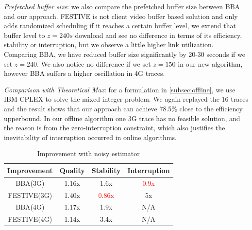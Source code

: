 
\emph{Prefetched buffer size}: we also compare the prefetched buffer size between BBA and our approach. FESTIVE is not client video buffer based solution and only adds randomized scheduling if it reaches a certain buffer level, we extend that buffer level to $z=240s$ download and see no difference in terms of its efficiency, stability or interruption, but we observe a little higher link utilization. Comparing BBA, we have reduced buffer size significantly by 20-30 seconds if we set $z=240$. We also notice no difference if we set $z=150$ in our new algorithm, however BBA suffers a higher oscillation in 4G traces. 


\emph{Comparison with Theoretical Max}: for a formulation in \autoref{subsec:offline}, we use IBM CPLEX to solve the mixed integer problem. We again replayed the 16 traces and the result shows that our approach can achieve 78.5\% close to the efficiency upperbound. In our offline algorithm one 3G trace has no feasible solution, and the reason is from the zero-interruption constraint, which also justifies the inevitability of interruption occurred in online algorithms. 



\begin{table}[t]

\begin{tabular} {|c |c |c |c |}
\hline
 Improvement &Quality &Stability & Interruption\\ \hline
BBA(3G)  & 1.16x&1.6x &\textcolor{red}{0.9x} \\ \hline
FESTIVE(3G)& 1.40x &\textcolor{red}{0.86x}& 5x\\ \hline
BBA(4G) & 1.17x& 1.9x& N/A \\ \hline
FESTIVE(4G) & 1.14x& 3.4x& N/A \\ \hline
\end{tabular}
\centering
\caption{Improvement with noisy estimator} \label{cap:table2}
\end{table}

